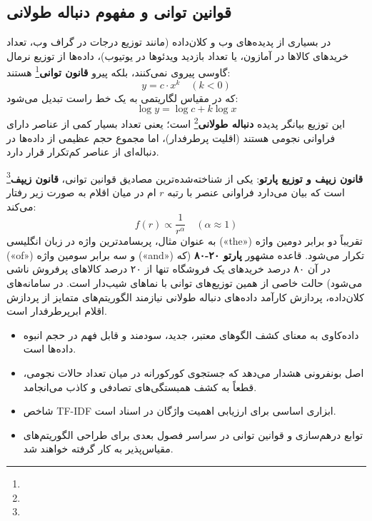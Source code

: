 \subsection{قوانین توانی و مفهوم دنباله طولانی}
در بسیاری از پدیده‌های وب و کلان‌داده (مانند توزیع درجات در گراف وب، تعداد خریدهای کالاها در آمازون، یا تعداد بازدید ویدئوها در یوتیوب)، داده‌ها از توزیع نرمال گاوسی پیروی نمی‌کنند، بلکه پیرو \textbf{قانون توانی}\footnote{} هستند:
\begin{equation}
y = c \cdot x^k \quad (k < 0)
\end{equation}
که در مقیاس لگاریتمی به یک خط راست تبدیل می‌شود:
\begin{equation}
\log y = \log c + k \log x
\end{equation}
این توزیع بیانگر پدیده \textbf{دنباله طولانی}\footnote{} است؛ یعنی تعداد بسیار کمی از عناصر دارای فراوانی نجومی هستند (اقلیت پرطرفدار)، اما مجموع حجم عظیمی از داده‌ها در دنباله‌ای از عناصر کم‌تکرار قرار دارد.

\textbf{قانون زیپف و توزیع پارتو}:
یکی از شناخته‌شده‌ترین مصادیق قوانین توانی، \textbf{قانون زیپف}\footnote{} است که بیان می‌دارد فراوانی عنصر با رتبه $r$ ام در میان اقلام به صورت زیر رفتار می‌کند:
\begin{equation}
f(r) \propto \frac{1}{r^\alpha} \quad (\alpha \approx 1)
\end{equation}
به عنوان مثال، پربسامدترین واژه در زبان انگلیسی («the») تقریباً دو برابر دومین واژه («of») و سه برابر سومین واژه («and») تکرار می‌شود. قاعده مشهور \textbf{پارتو ۲۰-۸۰} (که در آن ۸۰ درصد خریدهای یک فروشگاه تنها از ۲۰ درصد کالاهای پرفروش ناشی می‌شود) حالت خاصی از همین توزیع‌های توانی با نماهای شیب‌دار است. در سامانه‌های کلان‌داده، پردازش کارآمد داده‌های دنباله طولانی نیازمند الگوریتم‌های متمایز از پردازش اقلام ابرپرطرفدار است.

\begin{summarybox}
\begin{itemize}
    \item داده‌کاوی به معنای کشف الگوهای معتبر، جدید، سودمند و قابل فهم در حجم انبوه داده‌ها است.
    \item اصل بونفرونی هشدار می‌دهد که جستجوی کورکورانه در میان تعداد حالات نجومی، قطعاً به کشف همبستگی‌های تصادفی و کاذب می‌انجامد.
    \item شاخص TF-IDF ابزاری اساسی برای ارزیابی اهمیت واژگان در اسناد است.
    \item توابع درهم‌سازی و قوانین توانی در سراسر فصول بعدی برای طراحی الگوریتم‌های مقیاس‌پذیر به کار گرفته خواهند شد.
\end{itemize}
\end{summarybox}

